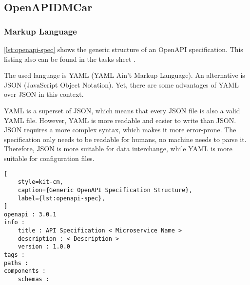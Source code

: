 \subsection{OpenAPIDMCar}
\subsubsection{Markup Language}
\autoref*{lst:openapi-spec} shows the generic structure of an OpenAPI specification.
This listing also can be found in the tasks sheet \cite{CM-T-DMC}.

The used language is YAML (YAML Ain't Markup Language).
An alternative is JSON (JavaScript Object Notation).
Yet, there are some advantages of YAML over JSON in this context.

YAML is a superset of JSON, which means that every JSON file is also a valid YAML file.
However, YAML is more readable and easier to write than JSON.
JSON requires a more complex syntax, which makes it more error-prone.
The specification only needs to be readable for humans, no machine needs to parse it.
Therefore, JSON is more suitable for data interchange, while YAML is more suitable for configuration files.

\begin{lstlisting}[
    style=kit-cm,
    caption={Generic OpenAPI Specification Structure},
    label={lst:openapi-spec},
]
openapi : 3.0.1
info :
    title : API Specification < Microservice Name >
    description : < Description >
    version : 1.0.0
tags :
paths :
components :
    schemas :
\end{lstlisting}